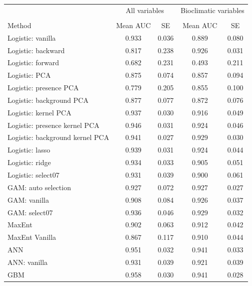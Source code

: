 \begin{table}[!htb]
\center
\begin{tabular}{lcccc}

 & \multicolumn{2}{c}{All variables} & \multicolumn{2}{c}{Bioclimatic variables}\\
\cline{2-3} \cline{4-5} \\
Method & Mean AUC & SE & Mean AUC & SE \\
\midrule
Logistic: vanilla               & 0.933 & 0.036 & 0.889& 0.080 \\
Logistic: backward              & 0.817 & 0.238 & 0.926& 0.031 \\
Logistic: forward               & 0.682 & 0.231 & 0.493& 0.211 \\
Logistic: PCA                   & 0.875 & 0.074 & 0.857& 0.094 \\
Logistic: presence PCA          & 0.779 & 0.205 & 0.855& 0.100 \\
Logistic: background PCA        & 0.877 & 0.077 & 0.872& 0.076 \\
Logistic: kernel PCA            & 0.937 & 0.030 & 0.916& 0.049 \\
Logistic: presence kernel PCA   & 0.946 & 0.031 & 0.924& 0.046 \\
Logistic: background kernel PCA & 0.941 & 0.027 & 0.929& 0.030 \\
Logistic: lasso                 & 0.939 & 0.031 & 0.924& 0.044 \\
Logistic: ridge                 & 0.934 & 0.033 & 0.905& 0.051 \\
Logistic: select07              & 0.931 & 0.039 & 0.900& 0.061 \\
GAM: auto selection             & 0.927 & 0.072 & 0.927& 0.027 \\
GAM: vanilla                    & 0.908 & 0.084 & 0.926& 0.037 \\
GAM: select07                   & 0.936 & 0.046 & 0.929& 0.032 \\
MaxEnt                          & 0.902 & 0.063 & 0.912& 0.042 \\
MaxEnt Vanilla                  & 0.867 & 0.117 & 0.910& 0.044 \\
ANN                             & 0.951 & 0.032 & 0.941& 0.033 \\
ANN: vanilla                    & 0.931 & 0.039 & 0.921& 0.039 \\
GBM                             & 0.958 & 0.030 & 0.941& 0.028 \\
\bottomrule
\end{tabular}
\end{table}


